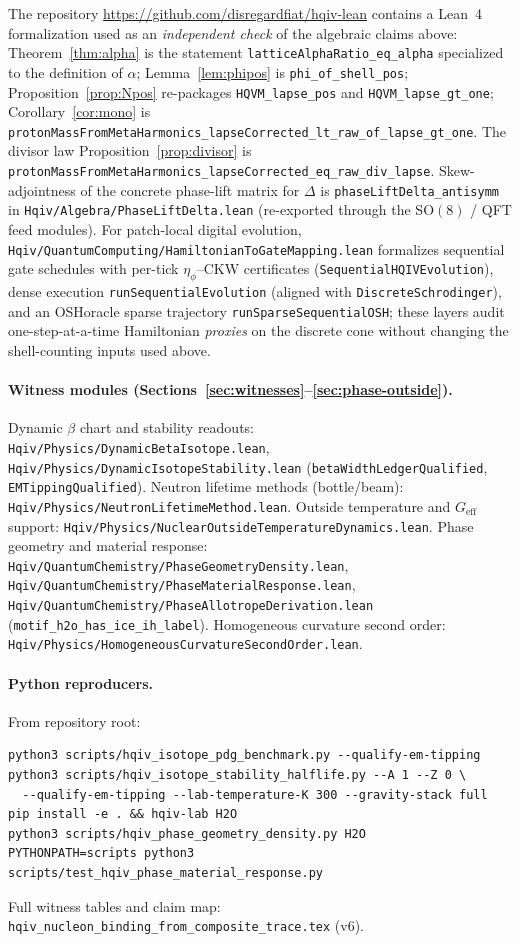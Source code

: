 \documentclass[11pt,a4paper]{article}
\newcommand{\repo}{\url{https://github.com/disregardfiat/hqiv-lean}}
\theoremstyle{plain}
\theoremstyle{definition}
\theoremstyle{remark}
\theoremstyle{plain}
\theoremstyle{definition}
\begin{document}
The repository \repo{} contains a Lean~4 formalization used as an \emph{independent check} of the algebraic claims above: Theorem~\ref{thm:alpha} is the statement \texttt{latticeAlphaRatio\_eq\_alpha} specialized to the definition of $\alpha$; Lemma~\ref{lem:phipos} is \texttt{phi\_of\_shell\_pos}; Proposition~\ref{prop:Npos} re-packages \texttt{HQVM\_lapse\_pos} and \texttt{HQVM\_lapse\_gt\_one}; Corollary~\ref{cor:mono} is \texttt{protonMassFromMetaHarmonics\_lapseCorrected\_lt\_raw\_of\_lapse\_gt\_one}.
The divisor law Proposition~\ref{prop:divisor} is \texttt{protonMassFromMetaHarmonics\_lapseCorrected\_eq\_raw\_div\_lapse}.
Skew-adjointness of the concrete phase-lift matrix for $\Delta$ is \texttt{phaseLiftDelta\_antisymm} in \texttt{Hqiv/Algebra/PhaseLiftDelta.lean} (re-exported through the SO$(8)$ / QFT feed modules).
For patch-local digital evolution, \texttt{Hqiv/QuantumComputing/HamiltonianToGateMapping.lean} formalizes sequential gate schedules with per-tick $\eta_\phi$--CKW certificates (\texttt{SequentialHQIVEvolution}), dense execution \texttt{runSequentialEvolution} (aligned with \texttt{DiscreteSchrodinger}), and an OSHoracle sparse trajectory \texttt{runSparseSequentialOSH}; these layers audit one-step-at-a-time Hamiltonian \emph{proxies} on the discrete cone without changing the shell-counting inputs used above.

\paragraph{Witness modules (Sections~\ref{sec:witnesses}--\ref{sec:phase-outside}).}
Dynamic $\beta$ chart and stability readouts:
\texttt{Hqiv/Physics/DynamicBetaIsotope.lean},
\texttt{Hqiv/Physics/DynamicIsotopeStability.lean}
(\texttt{betaWidthLedgerQualified}, \texttt{EMTippingQualified}).
Neutron lifetime methods (bottle/beam):
\texttt{Hqiv/Physics/NeutronLifetimeMethod.lean}.
Outside temperature and $G_{\mathrm{eff}}$ support:
\texttt{Hqiv/Physics/NuclearOutsideTemperatureDynamics.lean}.
Phase geometry and material response:
\texttt{Hqiv/QuantumChemistry/PhaseGeometryDensity.lean},
\texttt{Hqiv/QuantumChemistry/PhaseMaterialResponse.lean},
\texttt{Hqiv/QuantumChemistry/PhaseAllotropeDerivation.lean}
(\texttt{motif\_h2o\_has\_ice\_ih\_label}).
Homogeneous curvature second order:
\texttt{Hqiv/Physics/HomogeneousCurvatureSecondOrder.lean}.

\paragraph{Python reproducers.}
From repository root:
\begin{verbatim}
python3 scripts/hqiv_isotope_pdg_benchmark.py --qualify-em-tipping
python3 scripts/hqiv_isotope_stability_halflife.py --A 1 --Z 0 \
  --qualify-em-tipping --lab-temperature-K 300 --gravity-stack full
pip install -e . && hqiv-lab H2O
python3 scripts/hqiv_phase_geometry_density.py H2O
PYTHONPATH=scripts python3 scripts/test_hqiv_phase_material_response.py
\end{verbatim}
Full witness tables and claim map: \texttt{hqiv\_nucleon\_binding\_from\_composite\_trace.tex} (v6).
\end{document}
